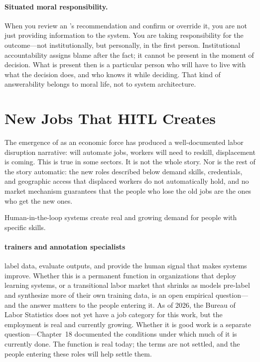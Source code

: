 \paragraph{Situated moral responsibility.} When you review an \ai's recommendation and confirm or override it, you are not just providing information to the system. You are taking responsibility for the outcome---not institutionally, but personally, in the first person. Institutional accountability assigns blame after the fact; it cannot be present in the moment of decision. What is present then is a particular person who will have to live with what the decision does, and who knows it while deciding. That kind of answerability belongs to moral life, not to system architecture.

\section{New Jobs That HITL Creates}
\label{sec:ch19-new-jobs}

The emergence of \ai as an economic force has produced a well-documented labor disruption narrative: \ai will automate jobs, workers will need to reskill, displacement is coming. This is true in some sectors. It is not the whole story. Nor is the rest of the story automatic: the new roles described below demand skills, credentials, and geographic access that displaced workers do not automatically hold, and no market mechanism guarantees that the people who lose the old jobs are the ones who get the new ones.

Human-in-the-loop \ai systems create real and growing demand for people with specific skills.

\paragraph{\ai trainers and annotation specialists} label data, evaluate outputs, and provide the human signal that makes \ai systems improve. Whether this is a permanent function in organizations that deploy learning \ai systems, or a transitional labor market that shrinks as models pre-label and synthesize more of their own training data, is an open empirical question---and the answer matters to the people entering it. As of 2026, the Bureau of Labor Statistics does not yet have a job category for this work, but the employment is real and currently growing. Whether it is good work is a separate question---Chapter~18 documented the conditions under which much of it is currently done. The function is real today; the terms are not settled, and the people entering these roles will help settle them.

